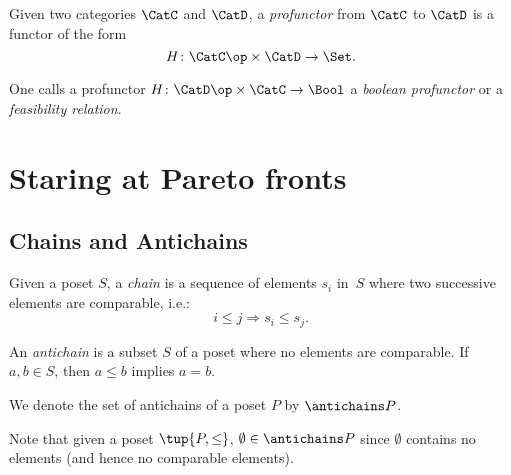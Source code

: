 \begin{shaded}
\begin{definition}[Profunctor]
\label{def:profunctor}
Given two categories $\CatC$ and $\CatD$, a \emph{profunctor} from $\CatC$ to $\CatD$ is a functor of the form
\begin{equation}
    H\colon \CatC\op \times \CatD \to \Set.
\end{equation}
\end{definition}
\begin{remark}
One calls a profunctor $H\colon \CatD\op \times \CatC \to \Bool$ a \emph{boolean profunctor} or a \emph{feasibility relation}.
\end{remark} 
\end{shaded}



\clearpage
\section{Staring at Pareto fronts}

\subsection{Chains and Antichains} \label{sec:chains-antichains}


\begin{definition}
\label{def:chain}
Given a poset $S$, a \emph{chain} is a sequence of elements ${s_i}$ in~$S$ where two successive elements are comparable, i.e.:
\begin{equation}
    i \leq j \Rightarrow s_i \leq s_j.
\end{equation}
\end{definition}

 
\begin{definition}
\label{def:antichain}
An \emph{antichain} is a subset $S$ of a poset where no elements are comparable. If $a,b \in S$, then $a \leq b$ implies $a=b$.
\end{definition}
\begin{remark}
We denote the set of antichains of a poset $P$ by $\antichains P$.
\end{remark}
\begin{remark}
Note that given a poset $\tup{P,\leq}$, $\emptyset \in \antichains P$ since $\emptyset$ contains no elements (and hence no comparable elements).
\end{remark}

